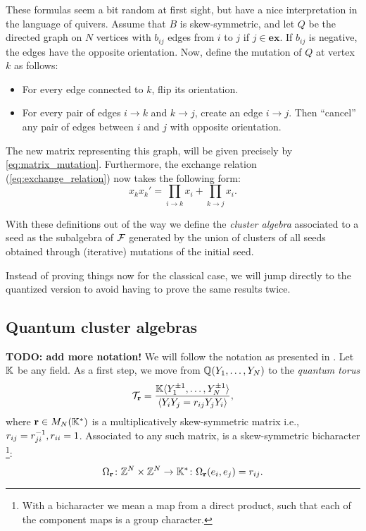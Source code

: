 \documentclass{article}
\newcommand{\ex}{\mathbf{ex}}
\begin{document}
\begin{remark}
	These formulas seem a bit random at first sight,
	but have a nice interpretation in the language of quivers.
	Assume that $B$ is skew-symmetric,
	and let $Q$ be the directed graph on $N$ vertices with $b_{ij}$ edges
	from $i$ to $j$ if $j \in \ex$. If $b_{ij}$ is negative,
	the edges have the opposite orientation.
	Now, define the mutation of $Q$ at vertex $k$ as follows:
	\begin{itemize}
		\item For every edge connected to $k$, flip its orientation.
		\item For every pair of edges $i\to k$ and $k\to j$, create an edge $i \to j$. Then
		      ``cancel'' any pair of edges between $i$ and $j$ with opposite orientation.
	\end{itemize}
	The new matrix representing this graph, will be given precisely by \cref{eq:matrix_mutation}.
	Furthermore, the exchange relation (\ref{eq:exchange_relation}) now takes the following form:
	\begin{equation*}
		x_kx_k' = \prod_{i \to k}x_i + \prod_{k \to j}x_i.
	\end{equation*}
\end{remark}

\medskip

With these definitions out of the way we define the \emph{cluster algebra} associated
to a seed as the subalgebra of $\mathcal{F}$ generated by the union of clusters of all seeds
obtained through (iterative) mutations of the initial seed.

Instead of proving things now for the classical case, we will jump directly to the
quantized version to avoid having to prove the same results twice.

\subsection{Quantum cluster algebras}

\textbf{TODO: add more notation!}
We will follow the notation as presented in \cite{GoodearlYakimov2017QCA}.
Let $\mathbb{K}$ be any field.
As a first step, we move from $\mathbb{Q}(Y_1, \dots, Y_N)$ to
the \emph{quantum torus}
\begin{equation*}
	\mathcal{T}_{\mathbf r} =
	\frac{\mathbb{K}\langle Y_1^{\pm 1}, \dots, Y_N^{\pm 1} \rangle}{\langle Y_iY_j = r_{ij}Y_jY_i \rangle},
\end{equation*}
where $\mathbf{r} \in M_N(\mathbb{K}^*)$ is a multiplicatively skew-symmetric matrix i.e.,
$r_{ij} = r_{ji}^{-1}, r_{ii} = 1$.
Associated to any such matrix, is a skew-symmetric bicharacter
\footnote{With a bicharacter we mean a map from a direct product,
	such that each of the component maps is a group character.}:
\begin{equation*}
	\Omega_{\mathbf{r}} \colon \mathbb{Z}^N \times \mathbb{Z}^N \to \mathbb{K}^* \colon
	\Omega_{\mathbf{r}}(e_i, e_j) = r_{ij}.
\end{equation*}
\end{document}
